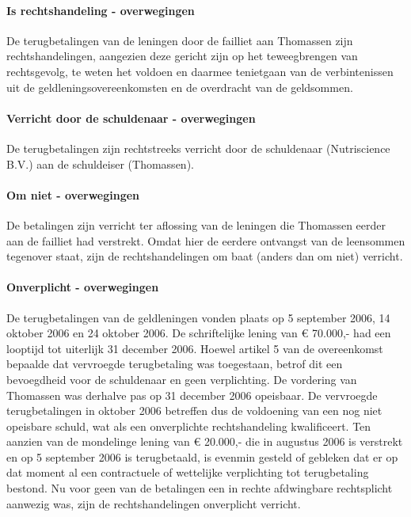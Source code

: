 \documentclass[
  dutch,
  a4paper,
]{article}
\begin{document}
\paragraph{Is rechtshandeling - overwegingen}\label{is-rechtshandeling---overwegingen-74}

De terugbetalingen van de leningen door de failliet aan Thomassen zijn rechtshandelingen, aangezien deze gericht zijn op het teweegbrengen van rechtsgevolg, te weten het voldoen en daarmee tenietgaan van de verbintenissen uit de geldleningsovereenkomsten en de overdracht van de geldsommen.

\paragraph{Verricht door de schuldenaar - overwegingen}\label{verricht-door-de-schuldenaar---overwegingen-74}

De terugbetalingen zijn rechtstreeks verricht door de schuldenaar (Nutriscience B.V.) aan de schuldeiser (Thomassen).

\paragraph{Om niet - overwegingen}\label{om-niet---overwegingen-74}

De betalingen zijn verricht ter aflossing van de leningen die Thomassen eerder aan de failliet had verstrekt. Omdat hier de eerdere ontvangst van de leensommen tegenover staat, zijn de rechtshandelingen om baat (anders dan om niet) verricht.

\paragraph{Onverplicht - overwegingen}\label{onverplicht---overwegingen-74}

De terugbetalingen van de geldleningen vonden plaats op 5 september 2006, 14 oktober 2006 en 24 oktober 2006. De schriftelijke lening van € 70.000,- had een looptijd tot uiterlijk 31 december 2006. Hoewel artikel 5 van de overeenkomst bepaalde dat vervroegde terugbetaling was toegestaan, betrof dit een bevoegdheid voor de schuldenaar en geen verplichting. De vordering van Thomassen was derhalve pas op 31 december 2006 opeisbaar. De vervroegde terugbetalingen in oktober 2006 betreffen dus de voldoening van een nog niet opeisbare schuld, wat als een onverplichte rechtshandeling kwalificeert. Ten aanzien van de mondelinge lening van € 20.000,- die in augustus 2006 is verstrekt en op 5 september 2006 is terugbetaald, is evenmin gesteld of gebleken dat er op dat moment al een contractuele of wettelijke verplichting tot terugbetaling bestond. Nu voor geen van de betalingen een in rechte afdwingbare rechtsplicht aanwezig was, zijn de rechtshandelingen onverplicht verricht.
\end{document}
